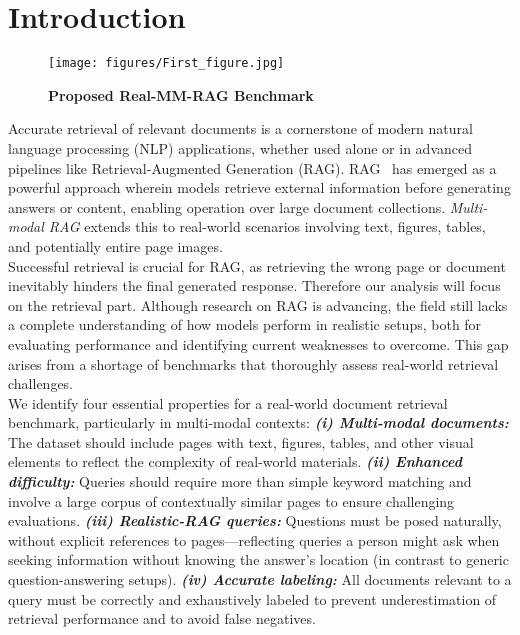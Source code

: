 \section{Introduction}
\label{sec:intro}


\begin{figure*}[ht!]
    \centering
    \texttt{[image: figures/First\_figure.jpg]} 
    \caption{\textbf{Proposed Real-MM-RAG Benchmark}}
    \vspace{-0.2cm}
    \label{fig:Benchmark} 
\end{figure*}

Accurate retrieval of relevant documents is a cornerstone of modern natural language processing (NLP) applications, whether used alone or in advanced pipelines like Retrieval-Augmented Generation (RAG). RAG~\citep{lewis2020retrieval} has emerged as a powerful approach wherein models retrieve external information before generating answers or content, enabling operation over large document collections. \emph{Multi-modal RAG} extends this to real-world scenarios involving text, figures, tables, and potentially entire page images.\\

\vspace{-0.15cm}
\noindent
Successful retrieval is crucial for RAG, as retrieving the wrong page or document inevitably hinders the final generated response. Therefore our analysis will focus on the retrieval part. Although research on RAG is advancing, the field still lacks a complete understanding of how models perform in realistic setups, both for evaluating performance and identifying current weaknesses to overcome. This gap arises from a shortage of benchmarks that thoroughly assess real-world retrieval challenges. \\

\vspace{-0.15cm}
\noindent
We identify four essential properties for a real-world document retrieval benchmark, particularly in multi-modal contexts: \textbf{\emph{(i) Multi-modal documents:}} The dataset should include pages with text, figures, tables, and other visual elements to reflect the complexity of real-world materials.
\textbf{\emph{(ii) Enhanced difficulty:}} Queries should require more than simple keyword matching and involve a large corpus of contextually similar pages to ensure challenging evaluations. \textbf{\emph{(iii) Realistic-RAG queries:}} Questions must be posed naturally, without explicit references to pages—reflecting queries a person might ask when seeking information without knowing the answer's location (in contrast to generic question-answering setups).
\textbf{\emph{(iv) Accurate labeling:}} All documents relevant to a query must be correctly and exhaustively labeled to prevent underestimation of retrieval performance and to avoid false negatives. \\

